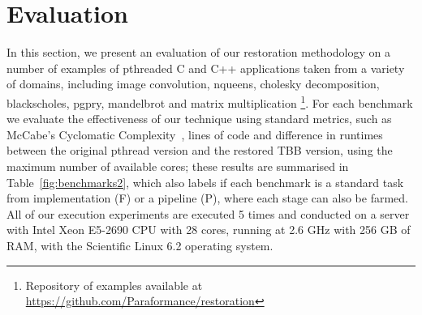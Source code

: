 %
%
%
%
%

\section{Evaluation}
\label{sec:evaluation}

In this section, we present an evaluation of our restoration methodology on a number of examples of pthreaded C and C++ applications taken from a variety of domains, including image convolution, nqueens, cholesky decomposition, blackscholes, pgpry, mandelbrot and matrix multiplication \footnote{Repository of examples available at \url{https://github.com/Paraformance/restoration}}. For each benchmark we evaluate the effectiveness of our technique using standard metrics, such as McCabe's Cyclomatic Complexity~\cite{10.1109/TSE.1976.233837}, lines of code and difference in runtimes between the original pthread version and the restored TBB version, using the maximum number of available cores; these results are summarised in Table~\ref{fig:benchmarks2}, which also labels if each benchmark is a standard task from implementation (F) or a pipeline (P), where each stage can also be farmed. All of our execution experiments are executed 5 times and conducted on a server with Intel Xeon E5-2690 CPU with 28 cores, running at 2.6 GHz with 256 GB of RAM, with the Scientific Linux 6.2 operating system.

